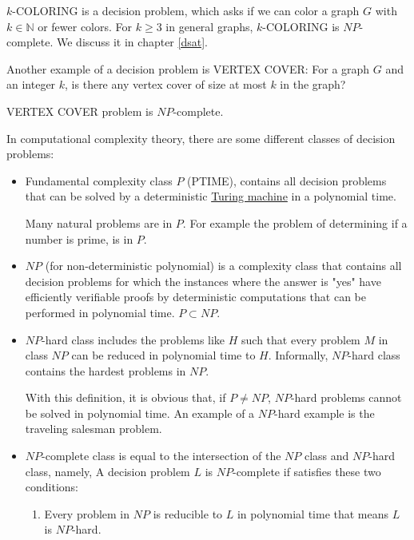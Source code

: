 \documentclass{beamer}
\begin{document}
{\begin{exam}
$k$-COLORING is a decision problem, which asks if we can color a graph $G$ with $k\in\mathbb{N}$ or fewer colors. For $k \geq 3$ in general graphs, $k$-COLORING is $NP$-complete. We discuss it in chapter \ref{dsat}.
\end{exam}

\begin{exam}
Another example of a decision problem is VERTEX COVER: For a graph $G$ and an integer $k$, is there any vertex cover of size at most $k$ in the graph? 
\end{exam}

\begin{theorem}
VERTEX COVER problem is $NP$-complete. \cite{karp}
\end{theorem}

\begin{defi}
In computational complexity theory, there are some different classes of decision problems:

\begin{itemize}
\item Fundamental complexity class $P$ (PTIME), contains all decision problems that can be solved by a deterministic \href{https://en.wikipedia.org/wiki/Turing_machine}{Turing machine}\cite{turing} in a polynomial time. 

Many natural problems are in $P$. For example the problem of determining if a number is prime, is in $P$\cite{manindra}.

\item $NP$ (for non-deterministic polynomial) is a complexity class that contains all decision problems for which the instances where the answer is "yes" have efficiently verifiable proofs by deterministic computations that can be performed in polynomial time. $P\subset NP$.

\item $NP$-hard class includes the problems like $H$ such that every problem $M$ in class $NP$ can be reduced in polynomial time to $H$. Informally, $NP$-hard class contains the hardest problems in $NP$. 

With this definition, it is obvious that, if $P \not= NP$, $NP$-hard problems cannot be solved in polynomial time. An example of a $NP$-hard example is the traveling salesman problem.\cite{lawler}

\item $NP$-complete class is equal to the intersection of the $NP$ class and $NP$-hard class, namely, A decision problem $L$ is $NP$-complete if satisfies these two conditions:
\begin{enumerate}
\item Every problem in $NP$ is reducible to $L$ in polynomial time that means $L$ is $NP$-hard.


\end{enumerate}
\end{itemize}
\end{defi}}
\end{document}
